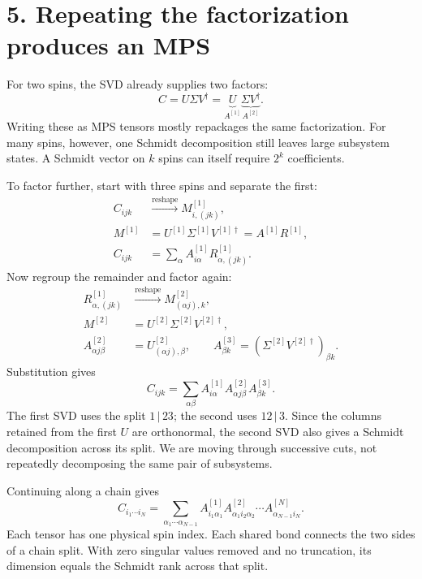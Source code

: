 \documentclass[11pt]{article}
\begin{document}
\newpage
\section*{5. Repeating the factorization produces an MPS}
For two spins, the SVD already supplies two factors:
\begin{equation}
C=U\Sigma V^\dagger
=\underbrace{U}_{A^{[1]}}\underbrace{\Sigma V^\dagger}_{A^{[2]}}.
\end{equation}
Writing these as MPS tensors mostly repackages the same factorization. For many spins, however, one Schmidt decomposition still leaves large subsystem states. A Schmidt vector on $k$ spins can itself require $2^k$ coefficients.

To factor further, start with three spins and separate the first:
\begin{align}
C_{ijk}&\xrightarrow{\text{reshape}}M^{[1]}_{i,(jk)},\\
M^{[1]}&=U^{[1]}\Sigma^{[1]}V^{[1]\dagger}=A^{[1]}R^{[1]},\\
C_{ijk}&=\sum_\alpha A^{[1]}_{i\alpha}R^{[1]}_{\alpha,(jk)}.
\end{align}
Now regroup the remainder and factor again:
\begin{align}
R^{[1]}_{\alpha,(jk)}&\xrightarrow{\text{reshape}}M^{[2]}_{(\alpha j),k},\\
M^{[2]}&=U^{[2]}\Sigma^{[2]}V^{[2]\dagger},\\
A^{[2]}_{\alpha j\beta}&=U^{[2]}_{(\alpha j),\beta},\qquad
A^{[3]}_{\beta k}=(\Sigma^{[2]}V^{[2]\dagger})_{\beta k}.
\end{align}
Substitution gives
\begin{equation}
\boxed{C_{ijk}=\sum_{\alpha\beta}
A^{[1]}_{i\alpha}A^{[2]}_{\alpha j\beta}A^{[3]}_{\beta k}.}
\end{equation}
The first SVD uses the split $1\,|\,23$; the second uses $12\,|\,3$. Since the columns retained from the first $U$ are orthonormal, the second SVD also gives a Schmidt decomposition across its split. We are moving through successive cuts, not repeatedly decomposing the same pair of subsystems.

Continuing along a chain gives
\begin{equation}
C_{i_1\cdots i_N}=\sum_{\alpha_1\cdots\alpha_{N-1}}
A^{[1]}_{i_1\alpha_1}A^{[2]}_{\alpha_1i_2\alpha_2}\cdots
A^{[N]}_{\alpha_{N-1}i_N}.
\end{equation}
Each tensor has one physical spin index. Each shared bond connects the two sides of a chain split. With zero singular values removed and no truncation, its dimension equals the Schmidt rank across that split.
\end{document}

